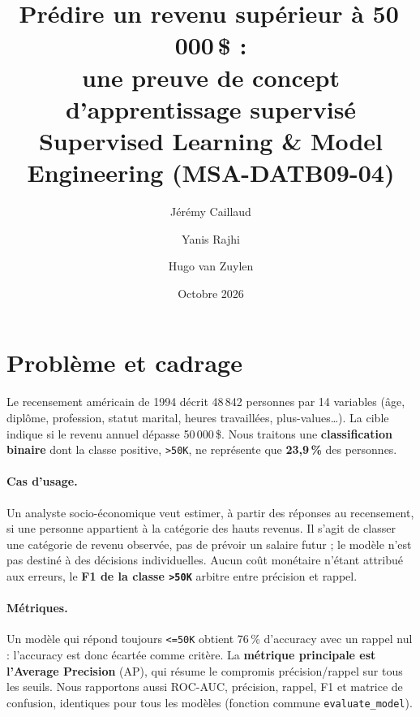 \documentclass[11pt,a4paper]{article}
\title{\textbf{Prédire un revenu supérieur à 50\,000\,\$ :\\une preuve de concept d'apprentissage supervisé}\\[4pt]
\large Supervised Learning \& Model Engineering (MSA-DATB09-04)}
\author{Jérémy Caillaud \and Yanis Rajhi \and Hugo van Zuylen}
\date{Octobre 2026}
\begin{document}
\maketitle

\begin{center}
\end{center}

\section{Problème et cadrage}

Le recensement américain de 1994 décrit 48\,842 personnes par 14 variables (âge, diplôme, profession, statut marital, heures travaillées, plus-values\ldots). La cible indique si le revenu annuel dépasse 50\,000\,\$. Nous traitons une \textbf{classification binaire} dont la classe positive, \texttt{>50K}, ne représente que \textbf{23,9\,\%} des personnes.

\paragraph{Cas d'usage.} Un analyste socio-économique veut estimer, à partir des réponses au recensement, si une personne appartient à la catégorie des hauts revenus. Il s'agit de classer une catégorie de revenu observée, pas de prévoir un salaire futur ; le modèle n'est pas destiné à des décisions individuelles. Aucun coût monétaire n'étant attribué aux erreurs, le \textbf{F1 de la classe \texttt{>50K}} arbitre entre précision et rappel.

\paragraph{Métriques.} Un modèle qui répond toujours \texttt{<=50K} obtient 76\,\% d'accuracy avec un rappel nul : l'accuracy est donc écartée comme critère. La \textbf{métrique principale est l'Average Precision} (AP), qui résume le compromis précision/rappel sur tous les seuils. Nous rapportons aussi ROC-AUC, précision, rappel, F1 et matrice de confusion, identiques pour tous les modèles (fonction commune \texttt{evaluate\_model}).
\end{document}
